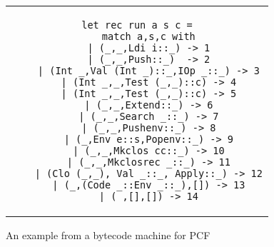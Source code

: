 \begin{figure}%
\centering
\begin{tabular}{c} %
\begin{lstlisting}[basicstyle=\scriptsize]
  let rec run a s c =
    match a,s,c with
    | (_,_,Ldi i::_) -> 1
    | (_,_,Push::_)  -> 2
    | (Int _,Val (Int _)::_,IOp _::_) -> 3
    | (Int _,_,Test (_,_)::c) -> 4
    | (Int _,_,Test (_,_)::c) -> 5
    | (_,_,Extend::_) -> 6
    | (_,_,Search _::_) -> 7
    | (_,_,Pushenv::_) -> 8
    | (_,Env e::s,Popenv::_) -> 9
    | (_,_,Mkclos cc::_) -> 10
    | (_,_,Mkclosrec _::_) -> 11
    | (Clo (_,_), Val _::_, Apply::_) -> 12
    | (_,(Code _::Env _::_),[]) -> 13
    | (_,[],[]) -> 14
\end{lstlisting}
\end{tabular}
\caption{An example from a bytecode machine for PCF}
\label{fig:pcf}
\end{figure}

